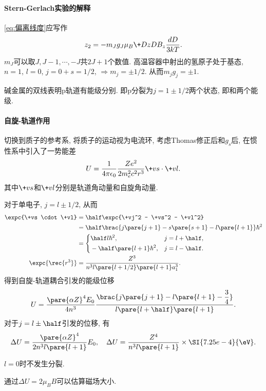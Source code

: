 \documentclass[hidelinks]{ctexart}
\begin{document}
\paragraph{Stern-Gerlach实验的解释} %
\label{par:stern_gerlach实验的解释}

\eqref{eq:偏离线度}应写作
\[ z_2 = -m_Jg_J\mu_B \+DzD{B_z} \frac{dD}{3kT}. \]
$m_J$可以取$J,J-1,\cdots,-J$共$2J+1$个数值. 高温容器中射出的氢原子处于基态, $n=1$, $l=0$, $j=0+s = 1/2$, $\Rightarrow m_j = \pm 1/2$. 从而$m_jg_j = \pm 1$.
\par
碱金属的双线表明p轨道有能级分别. 即p分裂为$j = 1\pm 1/2$两个状态, 即和两个能级.


\paragraph{自旋-轨道作用} %
\label{par:自旋_轨道作用}

切换到质子的参考系, 将质子的运动视为电流环, 考虑Thomas修正后和$g_s$后, 在惯性系中引入了一势能差
\[ U = \frac{1}{4\pi\epsilon_0} \frac{Ze^2}{2m_e^2c^2r^3}\+vs\cdot \+vl. \]
其中$\+vs$和$\+vl$分别是轨道角动量和自旋角动量.
\par
对于单电子, $j = l\pm 1/2$, 从而
\begin{align*}
    \expc{\+vs \cdot \+vl} &= \half \expc{\+vj^2 - \+vs^2 - \+vl^2} \\
    &= \half\brac{j\pare{j+1} - s\pare{s+1} - l\pare{l+1}}\hbar^2 \\
    &= \left\{ \begin{aligned}
        &\half l\hbar^2, && j = l+\half, \\
        &-\half\pare{l+1} \hbar^2, && j = l-\half.
    \end{aligned} \right. \\
    \expc{\rec{r^3}} &= \frac{Z^3}{n^3l\pare{l+1/2}\pare{l+1}a_1^3}.
\end{align*}
得到自旋-轨道耦合引发的能级位移
\[ U = \frac{\pare{\alpha Z}^4E_0}{4n^3} \frac{\displaystyle \brac{j\pare{j+1} - l\pare{l+1} - \frac{3}{4}}}{\displaystyle l\pare{l+\half}\pare{l+1}}. \]
对于$\displaystyle j = l\pm\half$引发的位移, 有
\[ \Delta U = \frac{\pare{\alpha Z}^4}{2n^3l\pare{l+1}}E_0,\quad \Delta U = \frac{Z^4}{n^3l\pare{l+1}}\times \SI{7.25e-4}{\eV}. \]
\begin{remark}
    $l=0$时不发生分裂.
\end{remark}
\begin{remark}
    通过$\Delta U = 2\mu_B B$可以估算磁场大小.
\end{remark}
\end{document}
